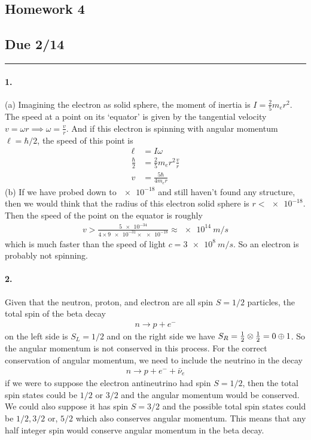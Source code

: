 \documentclass[../main.tex]{subfiles}
\begin{document}
\setcounter{section}{1}
\begin{center}
    \section*{Homework 4}
    \subsection*{Due 2/14}
\end{center}
\hrule \vspace{10px}

\paragraph*{1.} (a) Imagining the electron as solid sphere, the moment of inertia is 
$I = \frac{2}{5}m_e r^2$. The speed at a point on its `equator' is given by the tangential
velocity $v = \omega r \implies \omega = \frac{v}{r}$. And if this electron is spinning with angular
momentum $\ell = \hbar / 2$, the speed of this point is
\begin{align*}
    \ell &= I \omega \\
    \frac{\hbar}{2} &= \frac{2}{5}m_e r^2 \frac{v}{r} \\
    v &= \frac{5\hbar}{4m_e r}
\end{align*}
(b) If we have probed down to $\num{e-18}$ and still haven't found any structure, then we would 
think that the radius of this electron solid sphere is $r < \num{e-18}$. Then the speed of the
point on the equator is roughly
\begin{align*}
    v > \frac{\num{5e-34}}{4\times \num{9e-31} \times \num{e-18}} \approx \qty{e14}{m/s}
\end{align*}
which is much faster than the speed of light $c = \qty{3e8}{m/s}$. So an electron is probably not
spinning.

\paragraph*{2.} Given that the neutron, proton, and electron are all spin $S=1/2$ particles, the 
total spin of the beta decay
\begin{align*}
    n \to p + e^-
\end{align*}
on the left side is $S_L = 1/2$ and on the right side we have $S_R = \frac{1}{2} \otimes \frac{1}{2} = 0 \oplus 1$.
So the angular momentum is not conserved in this process. For the correct
conservation of angular momentum, we need to include the neutrino in the decay
\begin{align*}
    n \to p + e^- + \bar{\nu}_e
\end{align*}
if we were to suppose the electron antineutrino had spin $S=1/2$, then the total spin states could
be $1/2$ or $3/2$ and the angular momentum would be conserved. We could also suppose it has spin
$S=3/2$ and the possible total spin states could be $1/2, 3/2$ or, $5/2$ which also conserves angular
momentum. This means that any half integer spin would conserve angular momentum in the beta decay.
\end{document}
